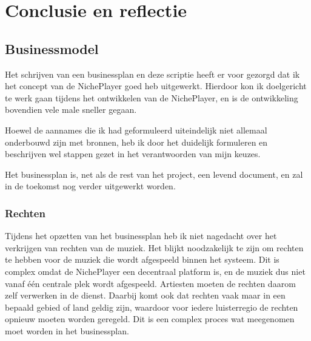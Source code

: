 \section{Conclusie en reflectie}


\subsection{Businessmodel}
Het schrijven van een businessplan en deze scriptie heeft er voor gezorgd dat ik het concept van de NichePlayer goed heb uitgewerkt. Hierdoor kon ik doelgericht te werk gaan tijdens het ontwikkelen van de NichePlayer, en is de ontwikkeling bovendien vele male sneller gegaan.

Hoewel de aannames die ik had geformuleerd uiteindelijk niet allemaal onderbouwd zijn met bronnen, heb ik door het duidelijk formuleren en beschrijven wel stappen gezet in het verantwoorden van mijn keuzes.

Het businessplan is, net als de rest van het project, een levend document, en zal in de toekomst nog verder uitgewerkt worden.

\subsubsection*{Rechten}
Tijdens het opzetten van het businessplan heb ik niet nagedacht over het verkrijgen van rechten van de muziek. Het blijkt noodzakelijk te zijn om rechten te hebben voor de muziek die wordt afgespeeld binnen het systeem. Dit is complex omdat de NichePlayer een decentraal platform is, en de muziek dus niet vanaf één centrale plek wordt afgespeeld. Artiesten moeten de rechten daarom zelf verwerken in de dienst. Daarbij komt ook dat rechten vaak maar in een bepaald gebied of land geldig zijn, waardoor voor iedere luisterregio de rechten opnieuw moeten worden geregeld. Dit is een complex proces wat meegenomen moet worden in het businessplan.

